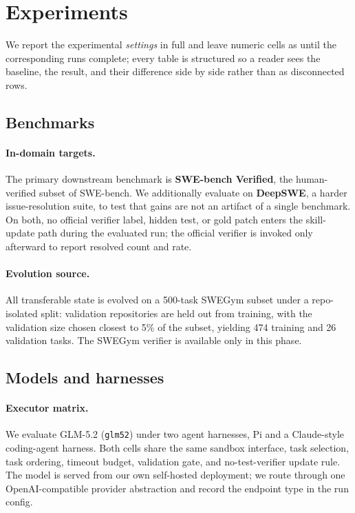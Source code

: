 \section{Experiments}

We report the experimental \emph{settings} in full and leave numeric cells as
\tbd{} until the corresponding runs complete; every table is structured so a
reader sees the baseline, the \method{} result, and their difference side by
side rather than as disconnected rows.

\subsection{Benchmarks}

\paragraph{In-domain targets.}
The primary downstream benchmark is \textbf{SWE-bench Verified}, the
human-verified subset of SWE-bench. We additionally evaluate on \textbf{DeepSWE},
a harder issue-resolution suite, to test that gains are not an artifact of a
single benchmark. On both, no official verifier label, hidden test, or gold patch
enters the skill-update path during the evaluated run; the official verifier is
invoked only afterward to report resolved count and rate.

\paragraph{Evolution source.}
All transferable state is evolved on a 500-task SWEGym subset under a
repo-isolated split: validation repositories are held out from training, with the
validation size chosen closest to 5\% of the subset, yielding 474 training and 26
validation tasks. The SWEGym verifier is available only in this phase.

\subsection{Models and harnesses}

\paragraph{Executor matrix.}
We evaluate GLM-5.2 (\texttt{glm52}) under two agent harnesses, Pi and a
Claude-style coding-agent harness. Both cells share the same sandbox interface,
task selection, task ordering, timeout budget, validation gate, and
no-test-verifier update rule. The model is served from our own self-hosted
deployment; we route through one OpenAI-compatible provider abstraction and
record the endpoint type in the run config.


